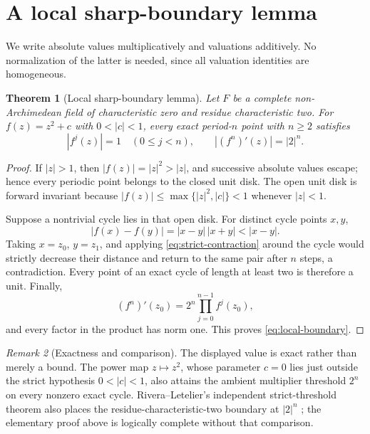 \documentclass[11pt]{article}
\newtheorem{theorem}{Theorem}[section]
\theoremstyle{definition}
\theoremstyle{remark}
\newtheorem{remark}[theorem]{Remark}
\begin{document}
\section{A local sharp-boundary lemma}
\label{sec:local}

We write absolute values multiplicatively and valuations additively.  No
normalization of the latter is needed, since all valuation identities are
homogeneous.

\begin{theorem}[Local sharp-boundary lemma]
\label{thm:local}
Let \(F\) be a complete non-Archimedean field of characteristic zero and
residue characteristic two.  For
\(f(z)=z^2+c\) with \(0<|c|<1\), every exact period-\(n\) point with
\(n\ge2\) satisfies
\begin{equation}
  |f^j(z)|=1\quad(0\le j<n),
  \qquad |(f^n)'(z)|=|2|^n.
  \label{eq:local-boundary}
\end{equation}
\end{theorem}

\begin{proof}
If \(|z|>1\), then
\(|f(z)|=|z|^2>|z|\), and successive absolute values escape; hence every
periodic point belongs to the closed unit disk.  The open unit disk is
forward invariant because
\(|f(z)|\le\max\{|z|^2,|c|\}<1\) whenever \(|z|<1\).

Suppose a nontrivial cycle lies in that open disk.  For distinct cycle
points \(x,y\),
\begin{equation}
  |f(x)-f(y)|=|x-y|\,|x+y|<|x-y|.
  \label{eq:strict-contraction}
\end{equation}
Taking \(x=z_0\), \(y=z_1\), and applying \eqref{eq:strict-contraction}
around the cycle would strictly decrease their distance and return to the
same pair after \(n\) steps, a contradiction.  Every point of an exact
cycle of length at least two is therefore a unit.  Finally,
\begin{equation}
  (f^n)'(z_0)=2^n\prod_{j=0}^{n-1}f^j(z_0),
\end{equation}
and every factor in the product has norm one.  This proves
\eqref{eq:local-boundary}.
\end{proof}

\begin{remark}[Exactness and comparison]
The displayed value is exact rather than merely a bound.  The power map
\(z\mapsto z^2\), whose parameter \(c=0\) lies just outside the strict
hypothesis \(0<|c|<1\), also attains the ambient multiplier threshold
\(2^n\) on every nonzero exact cycle.  Rivera--Letelier's independent
strict-threshold theorem also places the residue-characteristic-two boundary
at \(|2|^n\) \citep{riveraletelier2026critical}; the elementary proof above
is logically complete without that comparison.
\end{remark}
\end{document}
